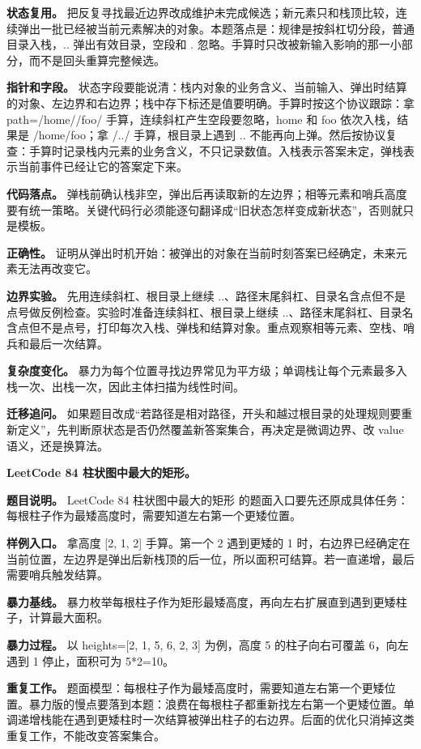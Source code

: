 \textbf{状态复用。} 把反复寻找最近边界改成维护未完成候选；新元素只和栈顶比较，连续弹出一批已经被当前元素解决的对象。本题落点是：规律是按斜杠切分段，普通目录入栈，.. 弹出有效目录，空段和 . 忽略。手算时只改被新输入影响的那一小部分，而不是回头重算完整候选。

\textbf{指针和字段。} 状态字段要能说清：栈内对象的业务含义、当前输入、弹出时结算的对象、左边界和右边界；栈中存下标还是值要明确。手算时按这个协议跟踪：拿 path=/home//foo/ 手算，连续斜杠产生空段要忽略，home 和 foo 依次入栈，结果是 /home/foo；拿 /../ 手算，根目录上遇到 .. 不能再向上弹。然后按协议复查：手算时记录栈内元素的业务含义，不只记录数值。入栈表示答案未定，弹栈表示当前事件已经让它的答案定下来。

\textbf{代码落点。} 弹栈前确认栈非空，弹出后再读取新的左边界；相等元素和哨兵高度要有统一策略。关键代码行必须能逐句翻译成“旧状态怎样变成新状态”，否则就只是模板。

\textbf{正确性。} 证明从弹出时机开始：被弹出的对象在当前时刻答案已经确定，未来元素无法再改变它。

\textbf{边界实验。} 先用连续斜杠、根目录上继续 ..、路径末尾斜杠、目录名含点但不是点号做反例检查。实验时准备连续斜杠、根目录上继续 ..、路径末尾斜杠、目录名含点但不是点号，打印每次入栈、弹栈和结算对象。重点观察相等元素、空栈、哨兵和最后一次结算。

\textbf{复杂度变化。} 暴力为每个位置寻找边界常见为平方级；单调栈让每个元素最多入栈一次、出栈一次，因此主体扫描为线性时间。

\textbf{迁移追问。} 如果题目改成“若路径是相对路径，开头和越过根目录的处理规则要重新定义”，先判断原状态是否仍然覆盖新答案集合，再决定是微调边界、改 value 语义，还是换算法。

\noindent\textbf{LeetCode 84 柱状图中最大的矩形。}

\textbf{题目说明。} LeetCode 84 柱状图中最大的矩形 的题面入口要先还原成具体任务：每根柱子作为最矮高度时，需要知道左右第一个更矮位置。

\textbf{样例入口。} 拿高度 [2, 1, 2] 手算。第一个 2 遇到更矮的 1 时，右边界已经确定在当前位置，左边界是弹出后新栈顶的后一位，所以面积可结算。若一直递增，最后需要哨兵触发结算。

\textbf{暴力基线。} 暴力枚举每根柱子作为矩形最矮高度，再向左右扩展直到遇到更矮柱子，计算最大面积。

\textbf{暴力过程。} 以 heights=[2, 1, 5, 6, 2, 3] 为例，高度 5 的柱子向右可覆盖 6，向左遇到 1 停止，面积可为 5*2=10。

\textbf{重复工作。} 题面模型：每根柱子作为最矮高度时，需要知道左右第一个更矮位置。暴力版的慢点要落到本题：浪费在每根柱子都重新找左右第一个更矮位置。单调递增栈能在遇到更矮柱时一次结算被弹出柱子的右边界。后面的优化只消掉这类重复工作，不能改变答案集合。

